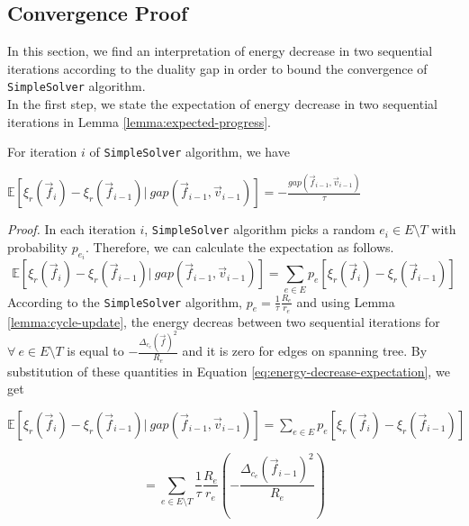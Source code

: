 \subsection{Convergence Proof}
\label{section:convergence-proof}
In this section, we find an interpretation of energy decrease in two sequential iterations according to the duality gap in order to bound the convergence of \texttt{SimpleSolver} algorithm.\\
In the first step, we state the expectation of energy decrease in two sequential iterations in Lemma \ref{lemma:expected-progress}.
\begin{lemma}
    \label{lemma:expected-progress}
    For iteration $i$ of \texttt{SimpleSolver} algorithm, we have
    \begin{center}
    $\mathds{E}[\xi_r(\overrightarrow{f}_i)-\xi_r(\overrightarrow{f}_{i-1})|~gap(\overrightarrow{f}_{i-1}, \overrightarrow{v}_{i-1})]=-\frac{gap(\overrightarrow{f}_{i-1}, \overrightarrow{v}_{i-1})}{\tau}$
    \end{center}
\end{lemma}
\textit{Proof.} In each iteration $i$, \texttt{SimpleSolver} algorithm picks a random $e_i \in E \setminus T$ with probability $p_{e_i}$. Therefore, we can calculate the expectation as follows.
\begin{equation}
    \label{eq:energy-decrease-expectation}
    \mathds{E}[\xi_r(\overrightarrow{f}_i)-\xi_r(\overrightarrow{f}_{i-1})|~gap(\overrightarrow{f}_{i-1}, \overrightarrow{v}_{i-1})]=\sum_{e \in E} p_e [\xi_r(\overrightarrow{f}_i)-\xi_r(\overrightarrow{f}_{i-1})]
\end{equation}
According to the \texttt{SimpleSolver} algorithm, $p_e=\frac{1}{\tau}\frac{R_e}{r_e}$ and using Lemma \ref{lemma:cycle-update}, the energy decreas between two sequential iterations for $\forall~e \in E \setminus T$ is equal to $-\frac{\Delta_{c_e}(\overrightarrow{f})^2}{R_e}$ and it is zero for edges on spanning tree. By substitution of these quantities in Equation \ref{eq:energy-decrease-expectation}, we get
\begin{center}
    
    $\mathds{E}[\xi_r(\overrightarrow{f}_i)-\xi_r(\overrightarrow{f}_{i-1})|~gap(\overrightarrow{f}_{i-1}, \overrightarrow{v}_{i-1})]=\sum_{e \in E} p_e [\xi_r(\overrightarrow{f}_i)-\xi_r(\overrightarrow{f}_{i-1})]$
\end{center}
\begin{equation}
    \label{eq:simplified-energy-decrease-expectation}
    =\sum_{e \in E\setminus T} \frac{1}{\tau}\frac{R_e}{r_e} (-\frac{\Delta_{c_e}(\overrightarrow{f}_{i-1})^2}{R_e})
\end{equation}
